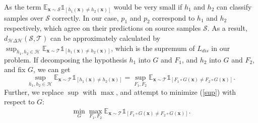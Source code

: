 \documentclass{article}
\begin{document}
As the term $\mathbb{E}_{\mathbf{x}\sim\mathcal{S}}\mathds{1}_{\left[h_1(\mathbf{x})\neq h_2(\mathbf{x})\right]}$ would be very small if $h_1$ and $h_2$ can classify samples over $\mathcal{S}$ correctly. In our case, $p_1$ and $p_2$ correspond to $h_1$ and $h_2$ respectively, which agree on their predictions on source samples $\mathcal{S}$. As a result, $d_{\mathcal{H}\Delta\mathcal{H}}(\mathcal{S},\mathcal{T})$ can be  approximately calculated by $\sup_{h_1,h_2\in\mathcal{H}}\mathbb{E}_{\mathbf{x}\sim\mathcal{T}}\mathds{1}_{\left[h_1(\mathbf{x})\neq h_2(\mathbf{x})\right]}$, which is the supremum of $L_{dis}$ in our problem. If decomposing the hypothesis $h_1$ into $G$ and $F_1$, and $h_2$ into $G$ and $F_2$, and fix $G$, we can get
\begin{equation}\label{sup}
\sup_{h_1,h_2\in\mathcal{H}}\mathbb{E}_{\mathbf{x}\sim\mathcal{T}}\mathds{1}_{\left[h_1(\mathbf{x})\neq h_2(\mathbf{x})\right]}= \sup_{F_1,F_2}\mathbb{E}_{\mathbf{x}\sim\mathcal{T}}\mathds{1}_{\left[F_1\circ
G(\mathbf{x})\neq F_2\circ
G(\mathbf{x})\right]}.
\end{equation}
Further, we replace $\sup$ with $\max$, and attempt to minimize (\ref{sup}) with respect to $G$:
\begin{align}\label{minmax}
    \min_{G}\max_{F_1,F_2}\mathbb{E}_{\mathbf{x}\sim\mathcal{T}}\mathds{1}_{\left[F_1\circ
G(\mathbf{x})\neq F_2\circ
G(\mathbf{x})\right]}.
\end{align}
\end{document}
